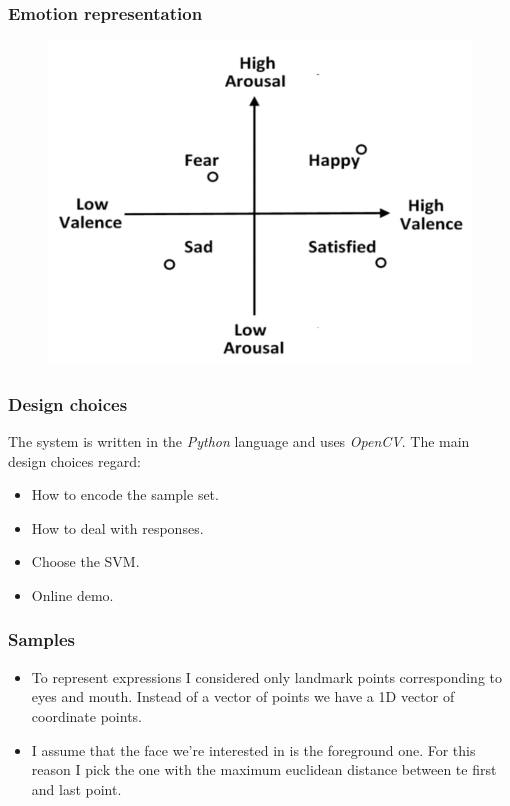 \documentclass{beamer}
\begin{document}
\begin{frame}
    \frametitle{Emotion representation}
    \begin{figure}
        \centering
        \includegraphics[scale=0.3]{../paper/images/emotion-classification.png}
    \end{figure}
\end{frame}

\begin{frame}
    \frametitle{Design choices}
    The system is written in the \textit{Python} language and uses \textit{OpenCV}.
    The main design choices regard:
    \begin{itemize}
        \item How to encode the sample set.
        \item How to deal with responses.
        \item Choose the SVM.
        \item Online demo.
    \end{itemize}
\end{frame}

\begin{frame}
    \frametitle{Samples}
    \begin{itemize}
        \item To represent expressions I considered only landmark points corresponding to eyes and mouth.
        Instead of a vector of points we have a 1D vector of coordinate points.
        
        \item I assume that the face we're interested in is the foreground one. For this reason I pick the one with the maximum euclidean distance between te first and last point.
    \end{itemize}
\end{frame}
\end{document}
